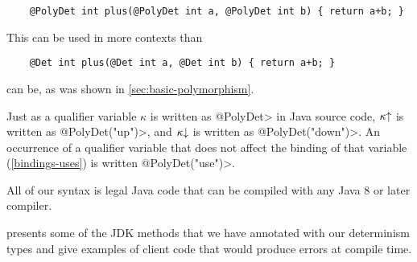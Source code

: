 \begin{verbatim}
    @PolyDet int plus(@PolyDet int a, @PolyDet int b) { return a+b; }
\end{verbatim}

\noindent
This can be used in more contexts than

\begin{verbatim}
    @Det int plus(@Det int a, @Det int b) { return a+b; }
\end{verbatim}

\noindent
can be, as was shown in \cref{sec:basic-polymorphism}.


Just as a qualifier variable $\kappa$ is written as \<@PolyDet> in Java
source code, $\up{\kappa}$ is written as \<@PolyDet("up")>, and
$\down{\kappa}$ is written as \<@PolyDet("down")>.  An occurrence of a
qualifier variable that does not affect the binding of that variable
(\cref{bindings-uses}) is written \<@PolyDet("use")>.


All of our syntax is legal Java code that can be compiled with any Java 8
or later compiler.


 presents some of the JDK methods that we have annotated with our determinism types and give examples of
client code that would produce errors at compile time.

%    

